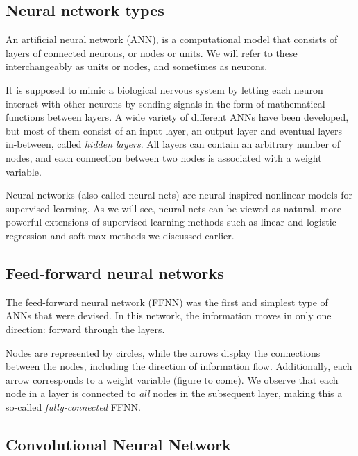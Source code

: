 \documentclass[11pt]{article}
\begin{document}
\hypertarget{neural-network-types}{%
\subsection{Neural network types}\label{neural-network-types}}

An artificial neural network (ANN), is a computational model that
consists of layers of connected neurons, or nodes or units. We will
refer to these interchangeably as units or nodes, and sometimes as
neurons.

It is supposed to mimic a biological nervous system by letting each
neuron interact with other neurons by sending signals in the form of
mathematical functions between layers. A wide variety of different ANNs
have been developed, but most of them consist of an input layer, an
output layer and eventual layers in-between, called \emph{hidden
layers}. All layers can contain an arbitrary number of nodes, and each
connection between two nodes is associated with a weight variable.

Neural networks (also called neural nets) are neural-inspired nonlinear
models for supervised learning. As we will see, neural nets can be
viewed as natural, more powerful extensions of supervised learning
methods such as linear and logistic regression and soft-max methods we
discussed earlier.

\hypertarget{feed-forward-neural-networks}{%
\subsection{Feed-forward neural
networks}\label{feed-forward-neural-networks}}

The feed-forward neural network (FFNN) was the first and simplest type
of ANNs that were devised. In this network, the information moves in
only one direction: forward through the layers.

Nodes are represented by circles, while the arrows display the
connections between the nodes, including the direction of information
flow. Additionally, each arrow corresponds to a weight variable (figure
to come). We observe that each node in a layer is connected to
\emph{all} nodes in the subsequent layer, making this a so-called
\emph{fully-connected} FFNN.

\hypertarget{convolutional-neural-network}{%
\subsection{Convolutional Neural
Network}\label{convolutional-neural-network}}
\end{document}

